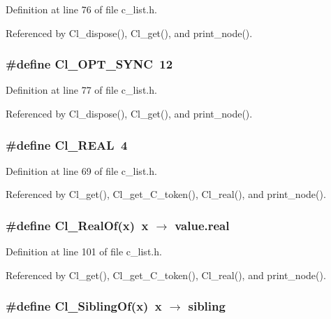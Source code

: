 Definition at line 76 of file c\_\-list.h.

Referenced by Cl\_\-dispose(), Cl\_\-get(), and print\_\-node().
\subsubsection{\setlength{\rightskip}{0pt plus 5cm}\#define Cl\_\-OPT\_\-SYNC~12}\label{c__list_8h_c5a08ce586f17579a391c42a8659fde1}




Definition at line 77 of file c\_\-list.h.

Referenced by Cl\_\-dispose(), Cl\_\-get(), and print\_\-node().
\subsubsection{\setlength{\rightskip}{0pt plus 5cm}\#define Cl\_\-REAL~4}\label{c__list_8h_f938682db865b098d804f6aac58853f0}




Definition at line 69 of file c\_\-list.h.

Referenced by Cl\_\-get(), Cl\_\-get\_\-C\_\-token(), Cl\_\-real(), and print\_\-node().
\subsubsection{\setlength{\rightskip}{0pt plus 5cm}\#define Cl\_\-Real\-Of(x)~x $\rightarrow$ value.real}\label{c__list_8h_5a91b87b918d1251a0f40e173fa7b7d4}




Definition at line 101 of file c\_\-list.h.

Referenced by Cl\_\-get(), Cl\_\-get\_\-C\_\-token(), Cl\_\-real(), and print\_\-node().
\subsubsection{\setlength{\rightskip}{0pt plus 5cm}\#define Cl\_\-Sibling\-Of(x)~x $\rightarrow$ sibling}\label{c__list_8h_63b563abf9509276bbbc4af2c7130fca}




